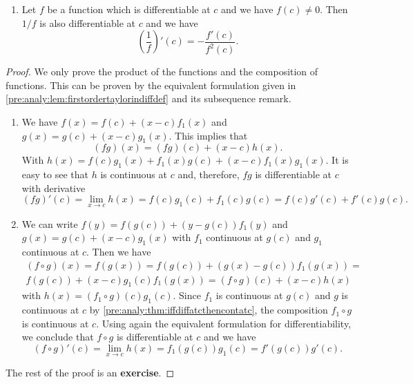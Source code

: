\documentclass[10pt, a4paper]{article}
\begin{document}
\begin{theorem}
\begin{enumerate}[label = (\alph*)]
        \item 
        Let $f$ be a function which is differentiable at $c$ and we have $f(c) \neq 0$.
        Then $1 / f$ is also differentiable at $c$ and we have
        \[
        \left(\frac{1}{f}\right)'(c) = -\frac{f'(c)}{f ^ 2(c)}.
        \]
    \end{enumerate}
    \begin{proof}
        We only prove the product of the functions and the composition of functions.
        This can be proven by the equivalent formulation given in \autoref{pre:analy:lem:firstordertaylorindiffdef} and its subsequence remark.
        \begin{enumerate}[label = (\alph*)]
            \item
            We have $f(x) = f(c) + (x - c)f_1(x)$ and $g(x) = g(c) + (x - c)g_1(x)$.
            This implies that
            \[
            (fg)(x) = (fg)(c) + (x - c)h(x).
            \]
            With $h(x) = f(c)g_1(x) + f_1(x)g(c) + (x - c)f_1(x)g_1(x)$.
            It is easy to see that $h$ is continuous at $c$ and,
            therefore,
            $fg$ is differentiable at $c$ with derivative
            \[
            (fg)'(c) = \lim_{x \rightarrow c}h(x) = f(c)g_1(c) + f_1(c)g(c) = f(c)g'(c) + f'(c)g(c).
            \]
            \item
            We can write $f(y) = f(g(c)) + (y - g(c))f_1(y)$ and $g(x) = g(c) + (x - c)g_1(x)$ with $f_1$ continuous at $g(c)$ and $g_1$ continuous at $c$.
            Then we have
            \begin{multline*}
                (f \circ g)(x) = f(g(x)) = f(g(c)) + (g(x) - g(c))f_1(g(x)) = \\
                f(g(c)) + (x - c)g_1(c)f_1(g(x)) = (f \circ g)(c) + (x - c)h(x)
            \end{multline*}
            with $h(x) = (f_1 \circ g)(c)g_1(c)$.
            Since $f_1$ is continuous at $g(c)$ and $g$ is continuous at $c$ by \autoref{pre:analy:thm:iffdiffatcthencontatc},
            the composition $f_1 \circ g$ is continuous at $c$.
            Using again the equivalent formulation for differentiability,
            we conclude that $f \circ g$ is differentiable at $c$ and we have
            \[
            (f \circ g)'(c) = \lim_{x \rightarrow c}h(x) = f_1(g(c))g_1(c) = f'(g(c))g'(c).
            \]
        \end{enumerate}

        The rest of the proof is an \textbf{exercise}.
    \end{proof}
\end{theorem}
\end{document}
